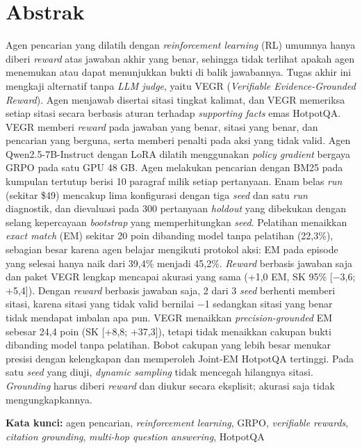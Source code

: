 \section*{Abstrak}\label{abstrak}

Agen pencarian yang dilatih dengan \emph{reinforcement learning} (RL)
umumnya hanya diberi \emph{reward} atas jawaban akhir yang benar,
sehingga tidak terlihat apakah agen menemukan atau dapat menunjukkan
bukti di balik jawabannya. Tugas akhir ini mengkaji alternatif tanpa
\emph{LLM judge}, yaitu VEGR (\emph{Verifiable Evidence-Grounded
Reward}). Agen menjawab disertai sitasi tingkat kalimat, dan VEGR
memeriksa setiap sitasi secara berbasis aturan terhadap \emph{supporting
facts} emas HotpotQA. VEGR memberi \emph{reward} pada jawaban yang
benar, sitasi yang benar, dan pencarian yang berguna, serta memberi
penalti pada aksi yang tidak valid. Agen Qwen2.5-7B-Instruct dengan LoRA
dilatih menggunakan \emph{policy gradient} bergaya GRPO pada satu GPU 48
GB. Agen melakukan pencarian dengan BM25 pada kumpulan tertutup berisi
10 paragraf milik setiap pertanyaan. Enam belas \emph{run} (sekitar
\$49) mencakup lima konfigurasi dengan tiga \emph{seed} dan satu
\emph{run} diagnostik, dan dievaluasi pada 300 pertanyaan \emph{holdout}
yang dibekukan dengan selang kepercayaan \emph{bootstrap} yang
memperhitungkan \emph{seed}. Pelatihan menaikkan \emph{exact match} (EM)
sekitar 20 poin dibanding model tanpa pelatihan (22,3\%), sebagian besar
karena agen belajar mengikuti protokol aksi: EM pada episode yang
selesai hanya naik dari 39,4\% menjadi 45,2\%. \emph{Reward} berbasis
jawaban saja dan paket VEGR lengkap mencapai akurasi yang sama (+1,0 EM,
SK 95\% {[}−3,6; +5,4{]}). Dengan \emph{reward} berbasis jawaban saja, 2
dari 3 \emph{seed} berhenti memberi sitasi, karena sitasi yang tidak
valid bernilai −1 sedangkan sitasi yang benar tidak mendapat imbalan apa
pun. VEGR menaikkan \emph{precision-grounded} EM sebesar 24,4 poin (SK
{[}+8,8; +37,3{]}), tetapi tidak menaikkan cakupan bukti dibanding model
tanpa pelatihan. Bobot cakupan yang lebih besar menukar presisi dengan
kelengkapan dan memperoleh Joint-EM HotpotQA tertinggi. Pada satu
\emph{seed} yang diuji, \emph{dynamic sampling} tidak mencegah hilangnya
sitasi. \emph{Grounding} harus diberi \emph{reward} dan diukur secara
eksplisit; akurasi saja tidak mengungkapkannya.

\textbf{Kata kunci:} agen pencarian, \emph{reinforcement learning},
GRPO, \emph{verifiable rewards}, \emph{citation grounding},
\emph{multi-hop question answering}, HotpotQA
